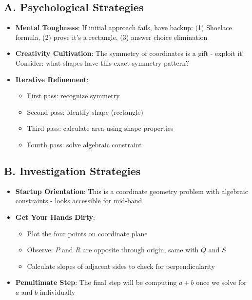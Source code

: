 \documentclass[]{article}
\begin{document}
\begin{strategicbox}
\subsection*{A. Psychological Strategies}
\begin{itemize}[leftmargin=*]
    \item \textbf{Mental Toughness}: If initial approach fails, have backup: (1) Shoelace formula, (2) prove it's a rectangle, (3) answer choice elimination
    
    \item \textbf{Creativity Cultivation}: The symmetry of coordinates is a gift - exploit it! Consider: what shapes have this exact symmetry pattern?
    
    \item \textbf{Iterative Refinement}: 
    \begin{itemize}
        \item First pass: recognize symmetry
        \item Second pass: identify shape (rectangle)
        \item Third pass: calculate area using shape properties
        \item Fourth pass: solve algebraic constraint
    \end{itemize}
\end{itemize}

\subsection*{B. Investigation Strategies}
\begin{itemize}[leftmargin=*]
    \item \textbf{Startup Orientation}: This is a coordinate geometry problem with algebraic constraints - looks accessible for mid-band
    
    \item \textbf{Get Your Hands Dirty}: 
    \begin{itemize}
        \item Plot the four points on coordinate plane
        \item Observe: $P$ and $R$ are opposite through origin, same with $Q$ and $S$
        \item Calculate slopes of adjacent sides to check for perpendicularity
    \end{itemize}
    
    \item \textbf{Penultimate Step}: The final step will be computing $a+b$ once we solve for $a$ and $b$ individually
    

\end{itemize}
\end{strategicbox}
\end{document}
